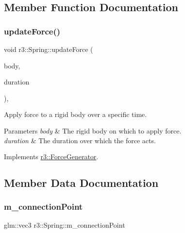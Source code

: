 \subsection{Member Function Documentation}
\mbox{\label{classr3_1_1_spring_a3305adfd568606ed9ae6fb589f20446b}} 
\subsubsection{\texorpdfstring{update\+Force()}{updateForce()}}
{\footnotesize\ttfamily void r3\+::\+Spring\+::update\+Force (\begin{DoxyParamCaption}\item[{\mbox{\hyperlink{classr3_1_1_rigid_body}{Rigid\+Body}} $\ast$}]{body,  }\item[{\mbox{\hyperlink{namespacer3_ab2016b3e3f743fb735afce242f0dc1eb}{real}}}]{duration }\end{DoxyParamCaption})\hspace{0.3cm}{\ttfamily [override]}, {\ttfamily [virtual]}}



Apply force to a rigid body over a specific time. 


\begin{DoxyParams}{Parameters}
{\em body} & The rigid body on which to apply force. \\
\hline
{\em duration} & The duration over which the force acts. \\
\hline
\end{DoxyParams}


Implements \mbox{\hyperlink{classr3_1_1_force_generator_a69bebbde8cef792d6636af50037af2aa}{r3\+::\+Force\+Generator}}.



\subsection{Member Data Documentation}
\mbox{\label{classr3_1_1_spring_a3c1e08e176ebc363b9f217875036955d}} 
\subsubsection{\texorpdfstring{m\+\_\+connection\+Point}{m\_connectionPoint}}
{\footnotesize\ttfamily glm\+::vec3 r3\+::\+Spring\+::m\+\_\+connection\+Point\hspace{0.3cm}{\ttfamily [protected]}}

